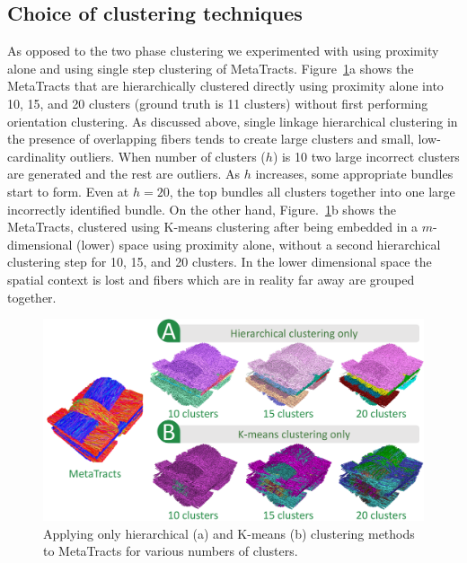 \subsection{Choice of clustering techniques}
As opposed to the two phase clustering we experimented with using proximity alone and using single step clustering of MetaTracts.
%  
Figure~\ref{fig:comparison}a shows the MetaTracts that are hierarchically clustered directly using proximity alone into 10, 15, and 20 clusters (ground truth is 11 clusters) without first performing orientation clustering. As discussed above, single linkage hierarchical clustering in the presence of overlapping fibers tends to create large clusters and small, low-cardinality outliers. When number of clusters ($h$) is 10 two large incorrect clusters are generated and the rest are outliers. As $h$ increases, some appropriate bundles start to form. Even at $h=20$, the top bundles all clusters together into one large incorrectly identified bundle.
%
On the other hand, Figure.~\ref{fig:comparison}b shows the MetaTracts, clustered using K-means clustering after being embedded in a $m$-dimensional (lower) space using proximity alone, without a second hierarchical clustering step for 10, 15, and 20 clusters. In the lower dimensional space the spatial context is lost and fibers which are in reality far away are grouped together.
\begin{figure}[tb]
	\centering
	\includegraphics[width=\linewidth]{images_pvis/comparison_all.pdf}
	\caption{Applying only hierarchical (a) and K-means (b) clustering methods to MetaTracts for various numbers of clusters.}
	\label{fig:comparison}
\end{figure} 

